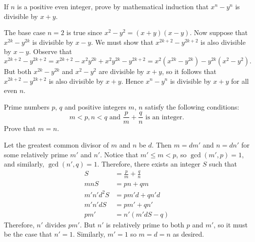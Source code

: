 \begin{question}
    If $n$ is a positive even integer, prove by mathematical induction that
    $x^n - y^n$ is divisible by $x + y$.
\end{question}
\begin{solution}
    The base case $n = 2$ is true since $x^2 - y^2 = (x + y)(x - y)$. Now
    suppose that $x^{2k} - y^{2k}$ is divisible by $x - y$. We must show that
    $x^{2k + 2} - y^{2k + 2}$ is also divisible by $x - y$. Observe that
    \[ x^{2k + 2} - y^{2k + 2} = x^{2k + 2} - x^2 y^{2k} + x^2 y^{2k} - y^{2k +
    2} = x^2(x^{2k} - y^{2k}) - y^{2k}(x^2 - y^2). \]
    But both $x^{2k} - y^{2k}$ and $x^2 - y^2$ are divisible by $x + y$, so it
    follows that $x^{2k + 2} - y^{2k + 2}$ is also divisible by $x + y$. Hence
    $x^n - y^n$ is divisible by $x + y$ for all even $n$.
\end{solution}

\begin{question}
    Prime numbers $p$, $q$ and positive integers $m$, $n$ satisfy the following
    conditions:
    \[m < p, n < q \text{  and  }\frac{p}{m}+\frac{q}{n} \text{  is an integer.}\]
    Prove that $m = n$.
\end{question}
\begin{solution}
    Let the greatest common divisor of $m$ and $n$ be $d$. Then $m = dm'$ and
    $n = dn'$ for some relatively prime $m'$ and $n'$. Notice that $m' \leq m <
    p$, so $\gcd(m', p) = 1$, and similarly, $\gcd(n', q) = 1$. Therefore,
    there exists an integer $S$ such that
    \begin{align*}
        S &= \frac{p}{m} + \frac{q}{n}\\
        mnS &= pn + qm\\
        m'n'd^2S &= pm'd + qn'd\\
        m'n'dS &= pm' + qn'\\
        pm' &= n'(m'dS - q)
    \end{align*}
    Therefore, $n'$ divides $pm'$. But $n'$ is relatively prime to both $p$ and
    $m'$, so it must be the case that $n' = 1$. Similarly, $m' = 1$ so $m = d =
    n$ as desired.
\end{solution}

